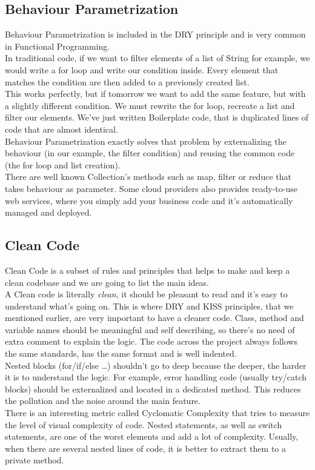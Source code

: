 \subsection{Behaviour Parametrization}
\label{subsec:behaviour-parametrization}
Behaviour Parametrization is included in the DRY principle and is very
common in Functional Programming. \\
\newline
In traditional code, if we want to filter elements of a list of String
for example, we would write a for loop and write our condition inside.
Every element that matches the condition are then added to a previously
created list. \\
This works perfectly, but if tomorrow we want to add the same feature,
but with a slightly different condition.
We must rewrite the for loop, recreate a list and filter our elements.
We've just written Boilerplate code, that is duplicated lines of code
that are almost identical. \\
\newline
Behaviour Parametrization exactly solves that problem by externalizing
the behaviour (in our example, the filter condition) and reusing the
common code (the for loop and list creation). \\
There are well known Collection's methods such as map, filter or reduce
that takes behaviour as parameter.
Some cloud providers also provides ready-to-use web services,
where you simply add your business code and it's automatically managed
and deployed.

\subsection{Clean Code}\label{subsec:clean-code}
Clean Code is a subset of rules and principles that helps to make and
keep a clean codebase and we are going to list the main ideas. \\
\newline
A Clean code is literally \textit{clean}, it should be
pleasant to read and it's easy to understand what's going on.
This is where DRY and KISS principles, that we mentioned earlier,
are very important to have a cleaner code.
Class, method and variable names should be meaningful and self
describing, so there's no need of extra comment to explain the logic.
The code across the project always follows the same standards, has the
same format and is well indented. \\
\newline
Nested blocks (for/if/else \ldots) shouldn't go to deep
because the deeper, the harder it is to understand the logic.
For example, error handling code (usually try/catch blocks) should be
externalized and located in a dedicated method.
This reduces the pollution and the noise around the main feature. \\
There is an interesting metric called Cyclomatic Complexity that tries to
measure the level of visual complexity of code.
Nested statements, as well as switch statements, are one of the worst
elements and add a lot of complexity.
Usually, when there are several nested lines of code, it is better to
extract them to a private method.

